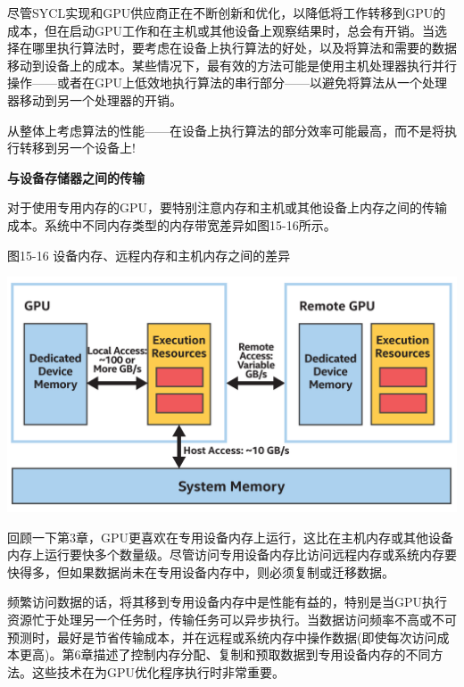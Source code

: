 尽管SYCL实现和GPU供应商正在不断创新和优化，以降低将工作转移到GPU的成本，但在启动GPU工作和在主机或其他设备上观察结果时，总会有开销。当选择在哪里执行算法时，要考虑在设备上执行算法的好处，以及将算法和需要的数据移动到设备上的成本。某些情况下，最有效的方法可能是使用主机处理器执行并行操作——或者在GPU上低效地执行算法的串行部分——以避免将算法从一个处理器移动到另一个处理器的开销。\par

\begin{tcolorbox}[colback=red!5!white,colframe=red!75!black]
从整体上考虑算法的性能——在设备上执行算法的部分效率可能最高，而不是将执行转移到另一个设备上!
\end{tcolorbox}

\hspace*{\fill} \par %
\textbf{与设备存储器之间的传输}

对于使用专用内存的GPU，要特别注意内存和主机或其他设备上内存之间的传输成本。系统中不同内存类型的内存带宽差异如图15-16所示。\par

\hspace*{\fill} \par %
图15-16 设备内存、远程内存和主机内存之间的差异
\begin{center}
	\includegraphics[width=1.0\textwidth]{content/chapter-15/images/12}
\end{center}

回顾一下第3章，GPU更喜欢在专用设备内存上运行，这比在主机内存或其他设备内存上运行要快多个数量级。尽管访问专用设备内存比访问远程内存或系统内存要快得多，但如果数据尚未在专用设备内存中，则必须复制或迁移数据。\par

频繁访问数据的话，将其移到专用设备内存中是性能有益的，特别是当GPU执行资源忙于处理另一个任务时，传输任务可以异步执行。当数据访问频率不高或不可预测时，最好是节省传输成本，并在远程或系统内存中操作数据(即使每次访问成本更高)。第6章描述了控制内存分配、复制和预取数据到专用设备内存的不同方法。这些技术在为GPU优化程序执行时非常重要。\par








